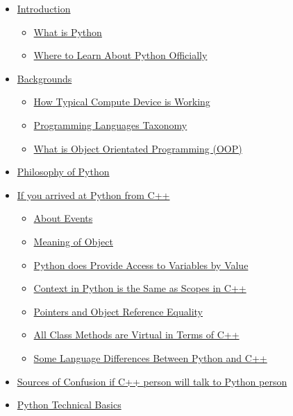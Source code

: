 \documentclass[
]{article}
\begin{document}
\begin{itemize}
\item
  \protect\hyperlink{introduction}{Introduction}

  \begin{itemize}
  \item
    \protect\hyperlink{what-is-python}{What is Python}
  \item
    \protect\hyperlink{where-to-learn-about-python-officially}{Where to
    Learn About Python Officially}
  \end{itemize}
\item
  \protect\hyperlink{backgrounds}{Backgrounds}

  \begin{itemize}
  \item
    \protect\hyperlink{how-typical-compute-device-is-working}{How
    Typical Compute Device is Working}
  \item
    \protect\hyperlink{programming-languages-taxonomy}{Programming
    Languages Taxonomy}
  \item
    \protect\hyperlink{what-is-object-orientated-programming--oop-}{What
    is Object Orientated Programming (OOP)}
  \end{itemize}
\item
  \protect\hyperlink{philosophy-of-python}{Philosophy of Python}
\item
  \protect\hyperlink{if-you-arrived-at-python-from-c--}{If you arrived
  at Python from C++}

  \begin{itemize}
  \item
    \protect\hyperlink{about-events}{About Events}
  \item
    \protect\hyperlink{meaning-of-object}{Meaning of Object}
  \item
    \protect\hyperlink{python-does-provide-access-to-variables-by-value}{Python
    does Provide Access to Variables by Value}
  \item
    \protect\hyperlink{context-in-python-is-the-same-as-scopes-in-c--}{Context
    in Python is the Same as Scopes in C++}
  \item
    \protect\hyperlink{pointers-and-object-reference-equality}{Pointers
    and Object Reference Equality}
  \item
    \protect\hyperlink{all-class-methods-are-virtual-in-terms-of-c--}{All
    Class Methods are Virtual in Terms of C++}
  \item
    \protect\hyperlink{some-language-differences-between-python-and-c--}{Some
    Language Differences Between Python and C++}
  \end{itemize}
\item
  \protect\hyperlink{sources-of-confusion-if-c---person-will-talk-to-python-person}{Sources
  of Confusion if C++ person will talk to Python person}
\item
  \protect\hyperlink{python-technical-basics}{Python Technical Basics}


\end{itemize}
\end{document}
